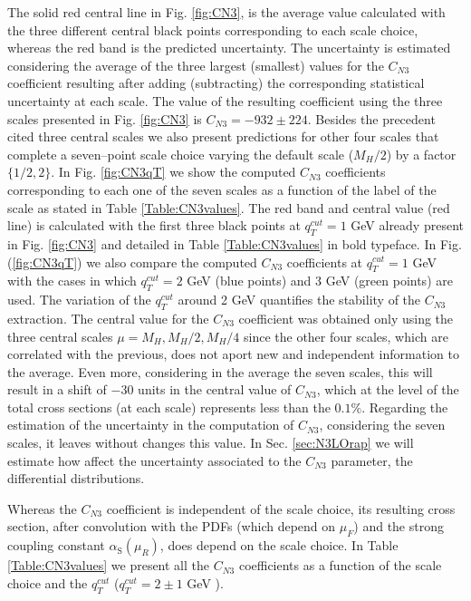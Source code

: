 \documentclass[12pt]{article}
\newcommand\as{\alpha_{\mathrm{S}}}
\begin{document}
The solid red central line in Fig. \ref{fig:CN3}, is the average value calculated with the three different central black points corresponding to each scale choice, whereas the red band is the predicted uncertainty. The uncertainty is estimated considering the average of the three largest (smallest) values for the $C_{N3}$ coefficient resulting after adding (subtracting) the corresponding statistical uncertainty at each scale. The value of the resulting coefficient using the three scales presented in Fig. \ref{fig:CN3} is $C_{N3}=-932 \pm 224$.  Besides the precedent cited three central scales we also present predictions for other four scales that complete a seven--point scale choice varying the default scale ($M_{H}/2$) by a factor $\{1/2,2\}$.  In Fig. \ref{fig:CN3qT} we show the computed $C_{N3}$ coefficients corresponding to each one of the seven scales as a function of the label of the scale as stated in Table \ref{Table:CN3values}. The red band and central value (red line) is calculated with the first three black points at $q^{cut}_{T}=1$ GeV already present in Fig. \ref{fig:CN3} and detailed in Table \ref{Table:CN3values} in bold typeface.  In Fig. (\ref{fig:CN3qT}) we also compare the  computed $C_{N3}$ coefficients at $q^{cut}_{T}=1$ GeV with the cases in which $q^{cut}_{T}=2$ GeV (blue points) and 3 GeV (green points) are used. The variation of the $q^{cut}_{T}$ around 2 GeV quantifies the stability of the $C_{N3}$ extraction. The central value for the $C_{N3}$ coefficient was obtained only using the three central scales $\mu=M_{H},M_{H}/2,M_{H}/4$ since the other four scales, which are correlated with the previous, does not aport new and independent information to the average. Even more, considering in the average the seven scales, this will result in a shift of $-30$ units in the central value of $C_{N3}$, which at the level of the total cross sections (at each scale) represents less than the $0.1\%$. Regarding the estimation of the uncertainty in the computation of $C_{N3}$, considering the seven scales, it leaves without changes this value. In Sec. \ref{sec:N3LOrap} we will estimate how affect the uncertainty associated to the $C_{N3}$ parameter, the differential distributions.

Whereas the $C_{N3}$ coefficient is independent of the scale choice, its resulting cross section, after convolution with the PDFs (which depend on $\mu_{F}$) and the strong coupling constant $\as(\mu_{R})$, does depend on the scale choice. In Table \ref{Table:CN3values} we present all the $C_{N3}$ coefficients as a function of the scale choice and the $q^{cut}_{T}$ ($q^{cut}_{T} = 2 \pm 1$ GeV ).
 
\end{document}
